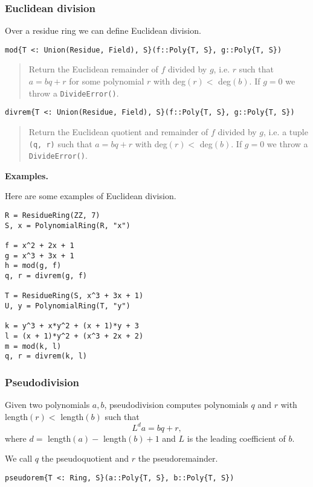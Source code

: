 \documentclass[a4paper,10pt]{article}
\newcommand{\code}{\lstinline}
\newcommand{\desc}[1]{\vspace{-3mm}\begin{quote}#1\end{quote}}
\begin{document}
{{{\subsubsection{Euclidean division}

Over a residue ring we can define Euclidean division.

\begin{lstlisting}
mod{T <: Union(Residue, Field), S}(f::Poly{T, S}, g::Poly{T, S})
\end{lstlisting}

\desc{Return the Euclidean remainder of $f$ divided by $g$, i.e. $r$ such 
that $a = bq + r$ for some polynomial $r$ with deg$(r) <$ deg$(b)$. If 
$g = 0$ we throw a \code{DivideError()}.}

\begin{lstlisting}
divrem{T <: Union(Residue, Field), S}(f::Poly{T, S}, g::Poly{T, S})
\end{lstlisting}

\desc{Return the Euclidean quotient and remainder of $f$ divided by $g$, i.e.
a tuple \code{(q, r)} such that $a = bq + r$ with deg$(r) <$ deg$(b)$. If 
$g = 0$ we throw a \code{DivideError()}.}

\textbf{Examples.}

Here are some examples of Euclidean division.

\begin{lstlisting}
R = ResidueRing(ZZ, 7)
S, x = PolynomialRing(R, "x")

f = x^2 + 2x + 1
g = x^3 + 3x + 1
h = mod(g, f)
q, r = divrem(g, f)

T = ResidueRing(S, x^3 + 3x + 1)
U, y = PolynomialRing(T, "y")

k = y^3 + x*y^2 + (x + 1)*y + 3
l = (x + 1)*y^2 + (x^3 + 2x + 2)
m = mod(k, l)
q, r = divrem(k, l)
\end{lstlisting}

\subsubsection{Pseudodivision}

Given two polynomials $a, b$, pseudodivision computes polynomials $q$ and $r$
with length$(r) <$ length$(b)$ such that
$$L^d a = bq + r,$$
where $d =$ length$(a) -$ length$(b) + 1$ and $L$ is the leading coefficient
of $b$.

We call $q$ the pseudoquotient and $r$ the pseudoremainder.

\begin{lstlisting}
pseudorem{T <: Ring, S}(a::Poly{T, S}, b::Poly{T, S})
\end{lstlisting}

}}}
\end{document}
